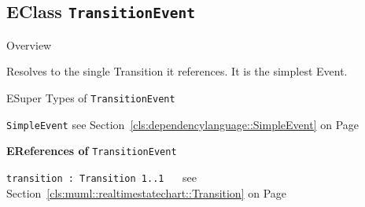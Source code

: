 \subsection{EClass \bfseries \texttt{TransitionEvent}\normalfont}
\label{cls:dependencylanguage::TransitionEvent} 
	
	\begin{longdescription}
		\item[Overview] 		
				

	

		Resolves to the single Transition it references.
It is the simplest Event.		
		\item[ESuper Types of \texttt{TransitionEvent}] ~
			\begin{longdescription}
				\item[\texttt{SimpleEvent}] see Section~\ref{cls:dependencylanguage::SimpleEvent} on Page~\pageref{cls:dependencylanguage::SimpleEvent}						\end{longdescription}
		
	
			\item[\textbf{EReferences of} \texttt{TransitionEvent}] ~
			\begin{longdescription}
	\item[\texttt{transition : Transition \symbol{"5B}1..1\symbol{"5D}
}] ~
	see Section~\ref{cls:muml::realtimestatechart::Transition} on Page~\pageref{cls:muml::realtimestatechart::Transition}
	
	\nopagebreak
		
				

	

	
			\end{longdescription}
	
	\end{longdescription}
	
			\newpage
	